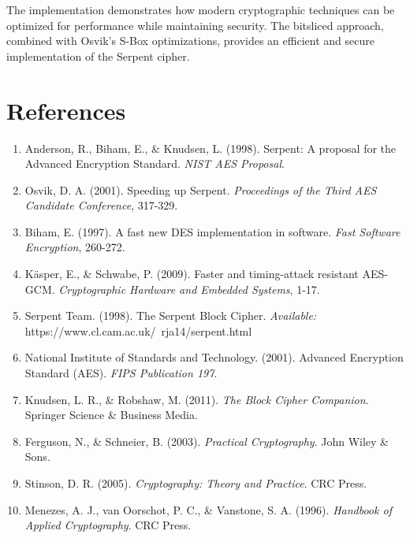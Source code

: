 \documentclass[12pt,a4paper]{article}
\begin{document}
The implementation demonstrates how modern cryptographic techniques can be optimized for performance while maintaining security. The bitsliced approach, combined with Osvik's S-Box optimizations, provides an efficient and secure implementation of the Serpent cipher.

\section{References}

\begin{enumerate}
    \item Anderson, R., Biham, E., \& Knudsen, L. (1998). Serpent: A proposal for the Advanced Encryption Standard. \textit{NIST AES Proposal}.
    
    \item Osvik, D. A. (2001). Speeding up Serpent. \textit{Proceedings of the Third AES Candidate Conference}, 317-329.
    
    \item Biham, E. (1997). A fast new DES implementation in software. \textit{Fast Software Encryption}, 260-272.
    
    \item Käsper, E., \& Schwabe, P. (2009). Faster and timing-attack resistant AES-GCM. \textit{Cryptographic Hardware and Embedded Systems}, 1-17.
    
    \item Serpent Team. (1998). The Serpent Block Cipher. \textit{Available:} https://www.cl.cam.ac.uk/~rja14/serpent.html
    
    \item National Institute of Standards and Technology. (2001). Advanced Encryption Standard (AES). \textit{FIPS Publication 197}.
    
    \item Knudsen, L. R., \& Robshaw, M. (2011). \textit{The Block Cipher Companion}. Springer Science \& Business Media.
    
    \item Ferguson, N., \& Schneier, B. (2003). \textit{Practical Cryptography}. John Wiley \& Sons.
    
    \item Stinson, D. R. (2005). \textit{Cryptography: Theory and Practice}. CRC Press.
    
    \item Menezes, A. J., van Oorschot, P. C., \& Vanstone, S. A. (1996). \textit{Handbook of Applied Cryptography}. CRC Press.
\end{enumerate}
\end{document}
